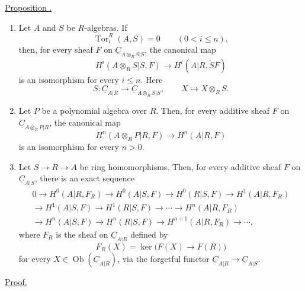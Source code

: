 
\underline{Proposition .}

\begin{enumerate}[label=(\alph*)]
\item Let $A$ and $S$ be $R$-algebras. If
\[
 \operatorname{Tor}_i^R(A,S)=0\qquad(0<i\leq n),
\]
then, for every sheaf $F$ on
$\underline C_{A\otimes_RS|S}$, the canonical map
\[
 H^i(A\otimes_RS|S,F)
 \longrightarrow H^i(A|R,\widetilde SF)
\]
is an isomorphism for every $i\leq n$. Here
\[
 S:\underline C_{A|R}\longrightarrow
 \underline C_{A\otimes_RS|S},
 \qquad X\longmapsto X\otimes_RS.
\]

\item Let $P$ be a polynomial algebra over $R$. Then, for every
additive sheaf $F$ on $\underline C_{A\otimes_RP|R}$, the
canonical map
\[
 H^n(A\otimes_RP|R,F)\longrightarrow H^n(A|R,F)
\]
is an isomorphism for every $n>0$.

\item Let $S\longrightarrow R\longrightarrow A$ be ring
homomorphisms. Then, for every additive sheaf $F$ on
$\underline C_{A|S}$, there is an exact sequence
\begin{multline*}
0\longrightarrow H^0(A|R,F_R)\longrightarrow H^0(A|S,F)
\longrightarrow H^0(R|S,F)\longrightarrow H^1(A|R,F_R)\\
\longrightarrow H^1(A|S,F)\longrightarrow H^1(R|S,F)
\longrightarrow\cdots\longrightarrow H^n(A|R,F_R)\\
\longrightarrow H^n(A|S,F)\longrightarrow H^n(R|S,F)
\longrightarrow H^{n+1}(A|R,F_R)\longrightarrow\cdots,
\end{multline*}
where $F_R$ is the sheaf on $\underline C_{A|R}$ defined by
\[
 F_R(X)=\ker\bigl(F(X)\longrightarrow F(R)\bigr)
\]
for every $X\in\operatorname{Ob}(\underline C_{A|R})$, via the
forgetful functor
$\underline C_{A|R}\longrightarrow\underline C_{A|S}$.
\end{enumerate}

\underline{Proof.}

